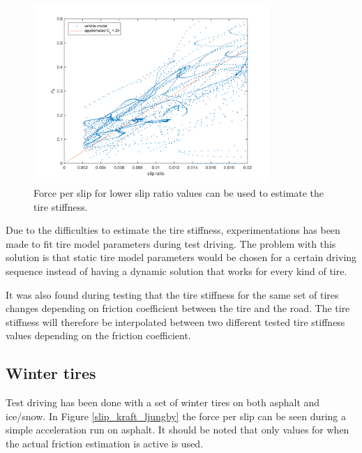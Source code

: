 \begin{figure}[h]
	\centering
	\includegraphics[width=0.8\textwidth]{Pictures/slip_kraft_sma_slip}
	\caption {Force per slip for lower slip ratio values can be used to estimate the tire stiffness.}
	\label{slip_kraft_sma_slip}
\end{figure}

Due to the difficulties to estimate the tire stiffness, experimentations has been made to fit tire model parameters during test driving. The problem with this solution is that static tire model parameters would be chosen for a certain driving sequence instead of having a dynamic solution that works for every kind of tire. 

It was also found during testing that the tire stiffness for the same set of tires changes depending on friction coefficient between the tire and the road. The tire stiffness will therefore be interpolated between two different tested tire stiffness values depending on the friction coefficient.

\subsection{Winter tires}
\label{winter_tire}
Test driving has been done with a set of winter tires on both asphalt and ice/snow. In Figure \ref{slip_kraft_ljungby} the force per slip can be seen during a simple acceleration run on asphalt. It should be noted that only values for when the actual friction estimation is active is used. 

